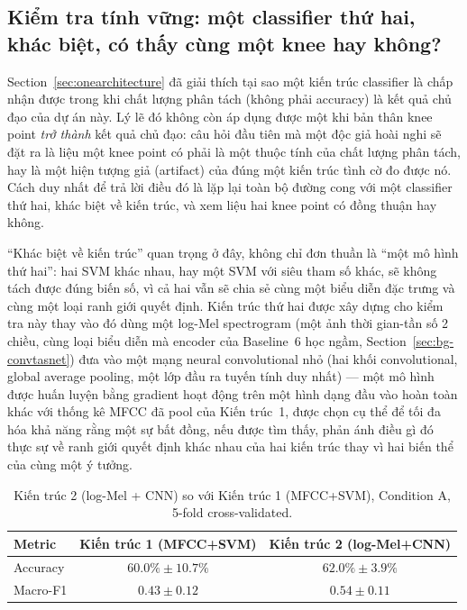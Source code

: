\documentclass[11pt]{article}
\begin{document}
\subsection{Kiểm tra tính vững: một classifier thứ hai, khác biệt, có thấy
cùng một knee hay không?}
\label{sec:robustness}

Section~\ref{sec:onearchitecture} đã giải thích tại sao một kiến trúc
classifier là chấp nhận được trong khi chất lượng phân tách (không phải
accuracy) là kết quả chủ đạo của dự án này. Lý lẽ đó không còn áp dụng
được một khi bản thân knee point \emph{trở thành} kết quả chủ đạo: câu
hỏi đầu tiên mà một độc giả hoài nghi sẽ đặt ra là liệu một knee point có
phải là một thuộc tính của chất lượng phân tách, hay là một hiện tượng
giả (artifact) của đúng một kiến trúc tình cờ đo được nó. Cách duy nhất
để trả lời điều đó là lặp lại toàn bộ đường cong với một classifier thứ
hai, khác biệt về kiến trúc, và xem liệu hai knee point có đồng thuận
hay không.

``Khác biệt về kiến trúc'' quan trọng ở đây, không chỉ đơn thuần là
``một mô hình thứ hai'': hai SVM khác nhau, hay một SVM với siêu tham số
khác, sẽ không tách được đúng biến số, vì cả hai vẫn sẽ chia sẻ cùng một
biểu diễn đặc trưng và cùng một loại ranh giới quyết định. Kiến trúc thứ
hai được xây dựng cho kiểm tra này thay vào đó dùng một log-Mel
spectrogram (một ảnh thời gian-tần số 2 chiều, cùng loại biểu diễn mà
encoder của Baseline~6 học ngầm, Section~\ref{sec:bg-convtasnet}) đưa vào
một mạng neural convolutional nhỏ (hai khối convolutional, global average
pooling, một lớp đầu ra tuyến tính duy nhất) --- một mô hình được huấn
luyện bằng gradient hoạt động trên một hình dạng đầu vào hoàn toàn khác
với thống kê MFCC đã pool của Kiến trúc~1, được chọn cụ thể để tối đa hóa
khả năng rằng một sự bất đồng, nếu được tìm thấy, phản ánh điều gì đó
thực sự về ranh giới quyết định khác nhau của hai kiến trúc thay vì hai
biến thể của cùng một ý tưởng.

\begin{table}[H]
\centering
\caption{Kiến trúc 2 (log-Mel + CNN) so với Kiến trúc 1 (MFCC+SVM), Condition A, 5-fold cross-validated.}
\label{tab:arch2}
\begin{tabular}{@{}lcc@{}}
\toprule
Metric & Kiến trúc 1 (MFCC+SVM) & Kiến trúc 2 (log-Mel+CNN) \\
\midrule
Accuracy & $60.0\% \pm 10.7\%$ & $62.0\% \pm 3.9\%$ \\
Macro-F1 & $0.43 \pm 0.12$    & $0.54 \pm 0.11$ \\
\bottomrule
\end{tabular}
\end{table}
\end{document}
